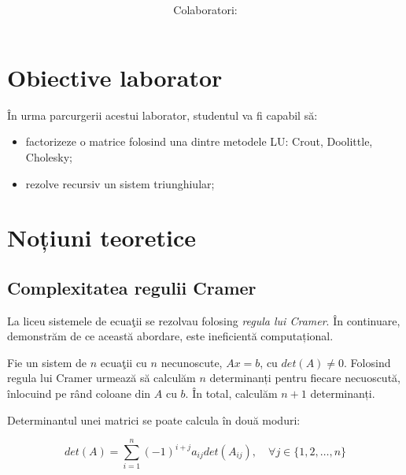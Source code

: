 \documentclass{exam}
\title{
\textmd{\textbf{\MNLabTitle}}
\author{Colaboratori: \MNAuthor}
}
\begin{document}
\begin{coverpages}

	\maketitle
	\tableofcontents

\end{coverpages}

\section{Obiective laborator}

\par În urma parcurgerii acestui laborator, studentul va fi capabil să:
\begin{itemize}
	\item factorizeze o matrice folosind una dintre metodele LU: Crout,
	      Doolittle, Cholesky;
	\item rezolve recursiv un sistem triunghiular;
\end{itemize}

\section{Noțiuni teoretice}

\subsection{Complexitatea regulii Cramer}

\par La liceu sistemele de ecuaţii se rezolvau folosing
\textit{regula lui Cramer}. În continuare, demonstrăm de ce această abordare,
este ineficientă computațional.

\par Fie un sistem de $n$ ecuaţii cu $n$ necunoscute, $Ax = b$, cu $det(A) \neq 0$.
Folosind regula lui Cramer urmează să calculăm $n$ determinanți pentru fiecare
necuoscută, înlocuind pe rând coloane din $A$ cu $b$. În total, calculăm
$n + 1$ determinanți.

\par Determinantul unei matrici se poate calcula în două moduri:

\begin{equation}
	det(A) = \sum_{i = 1}^{n}{(-1)^{i + j} a_{ij} det(A_{ij})}, \quad \forall j \in \{1, 2, \ldots, n\}
\end{equation}
\end{document}
